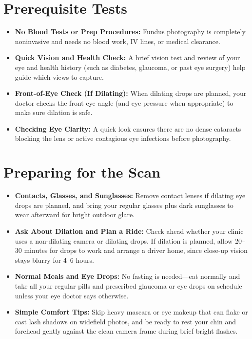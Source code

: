 \section{Prerequisite Tests}

\begin{itemize}
    \item \textbf{No Blood Tests or Prep Procedures:} Fundus photography is completely noninvasive and needs no blood work, IV lines, or medical clearance.
    \item \textbf{Quick Vision and Health Check:} A brief vision test and review of your eye and health history (such as diabetes, glaucoma, or past eye surgery) help guide which views to capture.
    \item \textbf{Front-of-Eye Check (If Dilating):} When dilating drops are planned, your doctor checks the front eye angle (and eye pressure when appropriate) to make sure dilation is safe.
    \item \textbf{Checking Eye Clarity:} A quick look ensures there are no dense cataracts blocking the lens or active contagious eye infections before photography.
\end{itemize}

\section{Preparing for the Scan}

\begin{itemize}
    \item \textbf{Contacts, Glasses, and Sunglasses:} Remove contact lenses if dilating eye drops are planned, and bring your regular glasses plus dark sunglasses to wear afterward for bright outdoor glare.
    \item \textbf{Ask About Dilation and Plan a Ride:} Check ahead whether your clinic uses a non-dilating camera or dilating drops. If dilation is planned, allow 20--30 minutes for drops to work and arrange a driver home, since close-up vision stays blurry for 4--6 hours.
    \item \textbf{Normal Meals and Eye Drops:} No fasting is needed---eat normally and take all your regular pills and prescribed glaucoma or eye drops on schedule unless your eye doctor says otherwise.
    \item \textbf{Simple Comfort Tips:} Skip heavy mascara or eye makeup that can flake or cast lash shadows on widefield photos, and be ready to rest your chin and forehead gently against the clean camera frame during brief bright flashes.
\end{itemize}


